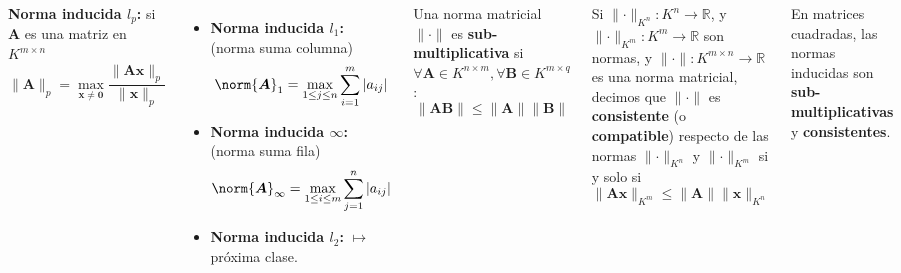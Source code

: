 \documentclass[9pt, aspectratio=169]{beamer}
\begin{document}
\begin{frame}
\begin{columns}[t]
\cx
\textbf{Norma inducida $l_p$:} si $\bm{A}$ es una matriz en $K^{m \times n}$
\[ \lVert \bm{A} \rVert_p = \max_{\bm{x} \neq \bm{0}} \frac{ \lVert \bm{A} \bm{x}\rVert_p }{\lVert \bm{x} \rVert_p} \]
\begin{itemize}
    \item \textbf{Norma inducida $l_1$:} (norma suma columna)
        \[ \norm{\bm{A}}_1 = \max_{1 \leq j \leq n} \sum_{i=1}^m |a_{ij}| \]
    \item \textbf{Norma inducida ${\infty}$:} (norma suma fila)
        \[ \norm{\bm{A}}_{\infty} = \max_{1 \leq i \leq m} \sum_{j=1}^n |a_{ij}| \]
    \item \textbf{Norma inducida $l_2$:} $\mapsto$ \alert{próxima clase}.
\end{itemize}
\pause

\cx
\begin{definition}
    Una norma matricial $\lVert \cdot \rVert$ es \textbf{sub-multiplicativa} si $\forall \bm{A} \in K^{n \times m}, \forall \bm{B} \in K^{m \times q}$:
    \[ \lVert \bm{A} \bm{B} \rVert \leq \lVert \bm{A} \rVert \lVert \bm{B} \rVert \]
\end{definition}

\begin{definition}[Consistencia]
    Si $\lVert \cdot \rVert_{K^n} : K^n \rightarrow \mathbb{R}$, y $\lVert \cdot \rVert_{K^m} : K^m \rightarrow \mathbb{R}$ son normas, y $\lVert \cdot \rVert : K^{m \times n} \rightarrow \mathbb{R}$ es una norma matricial, decimos que $\lVert \cdot \rVert$ es \textbf{consistente} (o \textbf{compatible}) respecto de las normas $\lVert \cdot \rVert_{K^n}$ y $\lVert \cdot \rVert_{K^m}$ si y solo si
    \[ \lVert \bm{A} \bm{x} \rVert_{K^m} \leq \lVert \bm{A} \rVert \lVert \bm{x} \rVert_{K^n} \]
\end{definition}
En matrices cuadradas, las normas inducidas son \textbf{sub-multiplicativas} y \textbf{consistentes}.
\end{columns}
\end{frame}
\end{document}
